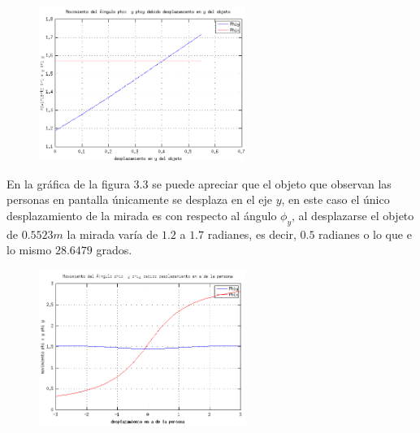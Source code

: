 \begin{figure}[htbp]
	\centering
	\includegraphics[width=0.6\textwidth]{./pictures/figure2}
	\caption{}\label{fig: figura}
\end{figure}
En la gráfica de la figura 3.3	se puede apreciar que el objeto que observan las personas en pantalla únicamente se desplaza en el eje $y$, en este caso el único desplazamiento de la mirada es con respecto al ángulo  $\phi_y$, al desplazarse el objeto de $0.5523m$ la mirada varía de $1.2$ a $1.7$ radianes, es decir, $0.5$ radianes o lo que e lo mismo $28.6479$ grados.
\begin{figure}[htbp]
	\centering
	\includegraphics[width=0.6\textwidth]{./pictures/figure3}
	\caption{}\label{fig: figura}
\end{figure}

